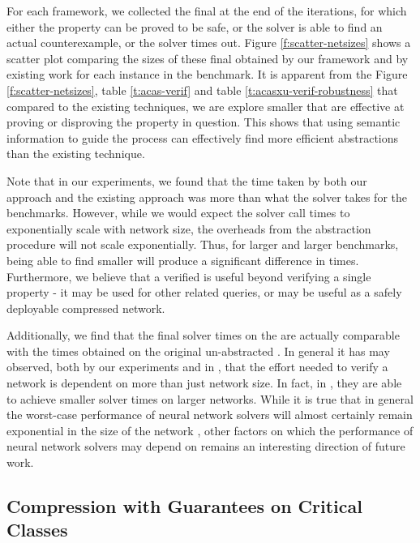For each framework, we collected the final \abs at the end of the \cegar
iterations, for which either the property can be proved to be safe, or 
the solver is able to find an actual counterexample, or the solver times out.  
Figure \ref{f:scatter-netsizes} shows a scatter plot comparing the sizes of these final \abs
obtained by our framework and by existing work \cite{cegar-nn} for each instance
in the benchmark. It is apparent from the Figure \ref{f:scatter-netsizes}, 
table \ref{t:acas-verif} and table \ref{t:acasxu-verif-robustness} that compared 
to the existing techniques, we are explore smaller \abs that are effective 
at proving or disproving the property in question.
This shows that using semantic information to guide the \cegar process can
effectively find more efficient abstractions than the existing technique.

Note that in our experiments, we found that the time taken by both our \cegar
approach and the existing \cegar approach \cite{cegar-nn} was more than what the
\neuralsat solver takes for the \acasxu benchmarks. However, while we would
expect the solver call times to exponentially scale with network size, the
overheads from the abstraction procedure will not scale exponentially. Thus, for
larger and larger benchmarks, being able to find smaller \abs will produce a
significant difference in times. Furthermore, we believe that a verified \abs is
useful beyond verifying a single property - it may be used for other related
queries, or may be useful as a safely deployable compressed network.

Additionally, we find that the final solver times on the \abs are actually
comparable with the times obtained on the original un-abstracted \cnc. In
general it has may observed, both by our experiments and in \cite{cegar-nn},
that the effort needed to verify a network is dependent
on more than just network size. In fact, in \cite{cegar-nn},
they are able to achieve smaller solver times on larger networks. 
While it is true that in general the worst-case performance of neural network
solvers will almost certainly remain exponential in the size of the network
\cite{reluplex}, other factors on which the performance of neural network
solvers may depend on remains an interesting direction of future work. 

\subsection{Compression with Guarantees on Critical Classes}
\label{s:exp-mnist-comp}

